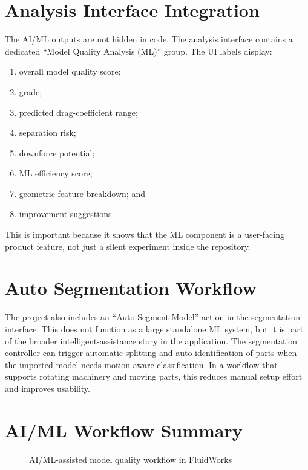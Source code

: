 \documentclass[12pt,a4paper,titlepage]{report}
\begin{document}
\section{Analysis Interface Integration}
The AI/ML outputs are not hidden in code. The analysis interface contains a dedicated ``Model Quality Analysis (ML)'' group. The UI labels display:
\begin{enumerate}
\item overall model quality score;
\item grade;
\item predicted drag-coefficient range;
\item separation risk;
\item downforce potential;
\item ML efficiency score;
\item geometric feature breakdown; and
\item improvement suggestions.
\end{enumerate}

This is important because it shows that the ML component is a user-facing product feature, not just a silent experiment inside the repository.

\section{Auto Segmentation Workflow}
The project also includes an ``Auto Segment Model'' action in the segmentation interface. This does not function as a large standalone ML system, but it is part of the broader intelligent-assistance story in the application. The segmentation controller can trigger automatic splitting and auto-identification of parts when the imported model needs motion-aware classification. In a workflow that supports rotating machinery and moving parts, this reduces manual setup effort and improves usability.

\section{AI/ML Workflow Summary}
\begin{figure}[H]
\centering
{}
\caption{AI/ML-assisted model quality workflow in FluidWorks}
\label{fig:mlflow}
\end{figure}
\end{document}
